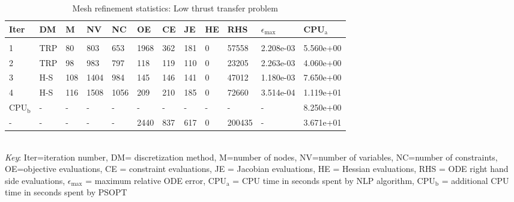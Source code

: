 
\begin{table}
\caption{Mesh refinement statistics: Low thrust transfer problem}
\label{mesh_stats_Low th}
\renewcommand{\tabcolsep}{0.15cm}
\tiny
\begin{tabular}{llllllllllll}
Iter&DM&M&NV&NC&OE&CE&JE&HE&RHS&$\epsilon_{\max}$&CPU$_\mathrm{a}$ \\ \hline \\
1&TRP&80&803&653&1968&362&181&0&57558&2.208e-03&5.560e+00\\
2&TRP&98&983&797&118&119&110&0&23205&2.263e-03&4.060e+00\\
3&H-S&108&1404&984&145&146&141&0&47012&1.180e-03&7.650e+00\\
4&H-S&116&1508&1056&209&210&185&0&72660&3.514e-04&1.119e+01\\
\hline
CPU$_\mathrm{b}$ &-&-&-&-&-&-&-&-&-&-&8.250e+00\\
-&-&-&-&-&2440&837&617&0&200435&-&3.671e+01\\
\end{tabular}
\newline \\ \emph{Key}: Iter=iteration number, DM= discretization method, M=number of nodes, NV=number of variables, NC=number of constraints, OE=objective evaluations,  	              CE = constraint evaluations, JE = Jacobian evaluations, HE = Hessian evaluations, RHS = ODE right hand side 		      evaluations, $\epsilon_{\max}$ = maximum relative ODE error, CPU$_\mathrm{a}$ = CPU time in seconds spent by NLP algorithm, 		      CPU$_\mathrm{b}$ = additional CPU time in seconds spent by PSOPT
\normalsize
\end{table}